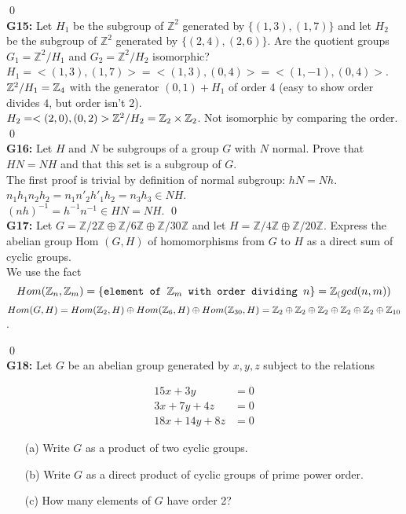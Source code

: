 \qed\\

\textbf{G15:} Let $H_{1}$ be the subgroup of $\mathbb{Z}^{2}$ generated by $\{(1,3),(1,7)\}$ and let $H_{2}$ be the subgroup of $\mathbb{Z}^{2}$ generated by $\{(2,4),(2,6)\}$. Are the quotient groups $G_{1}=\mathbb{Z}^{2} / H_{1}$ and $G_{2}=\mathbb{Z}^{2} / H_{2}$ isomorphic?\\
\soln
$ H_1=<(1,3),(1,7)>=<(1,3),(0,4)>=<(1,-1),(0,4)> $. $ \mathbb{Z}^2/H_1=\mathbb{Z}_4 $ with the generator $ (0,1)+H_1 $ of order $ 4 $ (easy to show order divides $ 4 $, but order isn't $ 2 $).\\
$ H_2=<(2,0),(0,2)> \mathbb{Z}^2/H_2=\mathbb{Z}_2\times \mathbb{Z}_2$. Not isomorphic by comparing the order.
\qed\\

\textbf{G16:} Let $H$ and $N$ be subgroups of a group $G$ with $N$ normal. Prove that $H N=N H$ and that this set is a subgroup of $G$.\\

\soln
The first proof is trivial by definition of normal subgroup: $ hN=Nh $.\\
$ n_1h_1n_2h_2=n_1n'_2h'_1h_2=n_3h_3\in NH $.\\
$ (nh)^{-1}=h^{-1}n^{-1}\in HN=NH $.
\qed\\

\textbf{G17:} Let $G=\mathbb{Z} / 2 \mathbb{Z} \oplus \mathbb{Z} / 6 \mathbb{Z} \oplus \mathbb{Z} / 30 \mathbb{Z}$ and let $H=\mathbb{Z} / 4 \mathbb{Z} \oplus \mathbb{Z} / 20 \mathbb{Z}$. Express the abelian group Hom $(G, H)$ of homomorphisms from $G$ to $H$ as a direct sum of cyclic groups.\\
\soln
We use the fact 
$$ Hom(\mathbb{Z}_n,\mathbb{Z}_m)=\{\texttt{element of }\mathbb{Z}_m \texttt{ with order dividing } n\}=\mathbb{Z}_(gcd(n,m)) $$
$ Hom(G,H)=Hom(\mathbb{Z}_2,H)\oplus Hom(\mathbb{Z}_6,H)\oplus Hom(\mathbb{Z}_{30},H)=\mathbb{Z}_2\oplus \mathbb{Z}_2 \oplus \mathbb{Z}_2\oplus \mathbb{Z}_2 \oplus \mathbb{Z}_2 \oplus \mathbb{Z}_{10} $.

\qed\\

\textbf{G18:} Let $G$ be an abelian group generated by $x, y, z$ subject to the relations

$$
\begin{aligned}
	15 x+3 y & =0 \\
	3 x+7 y+4 z & =0 \\
	18 x+14 y+8 z & =0
\end{aligned}
$$

\begin{itemize}
	\item[(a)] Write $G$ as a product of two cyclic groups.\\
	\item[(b)] Write $G$ as a direct product of cyclic groups of prime power order.\\
	\item[(c)] How many elements of $G$ have order 2?
\end{itemize}

